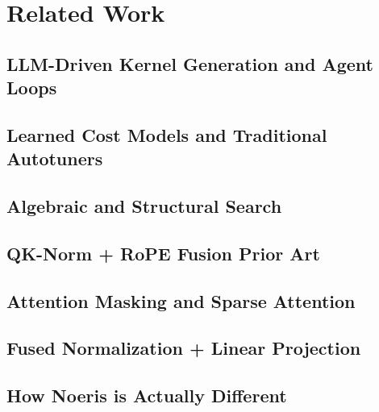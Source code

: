 \documentclass{article}
\begin{document}
\section{Related Work}
\label{sec:related}

\subsection{LLM-Driven Kernel Generation and Agent Loops}
\label{sec:rw-llm}

\subsection{Learned Cost Models and Traditional Autotuners}
\label{sec:rw-cost-models}

\subsection{Algebraic and Structural Search}
\label{sec:rw-algebraic}

\subsection{QK-Norm + RoPE Fusion Prior Art}
\label{sec:rw-fusion}

\subsection{Attention Masking and Sparse Attention}
\label{sec:rw-attention}

\subsection{Fused Normalization + Linear Projection}
\label{sec:rw-fused-norm}

\subsection{How Noeris is Actually Different}
\label{sec:rw-diff}

\end{document}
